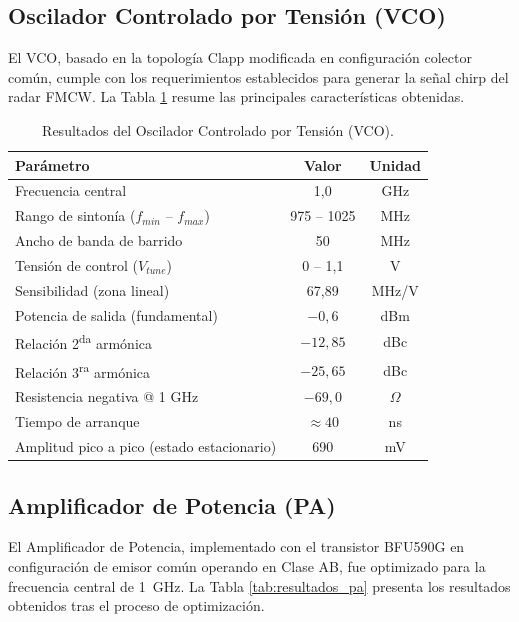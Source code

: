 \subsection{Oscilador Controlado por Tensión (VCO)}

El VCO, basado en la topología Clapp modificada en configuración colector común, cumple con los requerimientos establecidos para generar la señal chirp del radar FMCW. La Tabla \ref{tab:resultados_vco} resume las principales características obtenidas.

\begin{table}[htbp]
\centering
\caption{Resultados del Oscilador Controlado por Tensión (VCO).}
\label{tab:resultados_vco}
\begin{tabular}{@{}lcc@{}}
\toprule
\textbf{Parámetro} & \textbf{Valor} & \textbf{Unidad} \\
\midrule
Frecuencia central & 1,0 & GHz \\
Rango de sintonía ($f_{min}$ -- $f_{max}$) & 975 -- 1025 & MHz \\
Ancho de banda de barrido & 50 & MHz \\
Tensión de control ($V_{tune}$) & 0 -- 1,1 & V \\
Sensibilidad (zona lineal) & 67,89 & MHz/V \\
Potencia de salida (fundamental) & $-0,6$ & dBm \\
Relación 2\textsuperscript{da} armónica & $-12,85$ & dBc \\
Relación 3\textsuperscript{ra} armónica & $-25,65$ & dBc \\
Resistencia negativa @ 1 GHz & $-69,0$ & $\Omega$ \\
Tiempo de arranque & $\approx 40$ & ns \\
Amplitud pico a pico (estado estacionario) & 690 & mV \\
\bottomrule
\end{tabular}
\end{table}

\subsection{Amplificador de Potencia (PA)}

El Amplificador de Potencia, implementado con el transistor BFU590G en configuración de emisor común operando en Clase AB, fue optimizado para la frecuencia central de \qty{1}{\GHz}. La Tabla \ref{tab:resultados_pa} presenta los resultados obtenidos tras el proceso de optimización.

